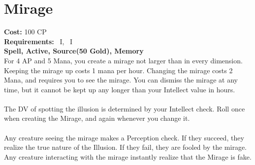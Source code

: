 \section{Mirage}\label{spell:mirage}
\textbf{Cost:} 100 CP\\
\textbf{Requirements:}~ I,~ I\\
\textbf{Spell, Active, Source(50 Gold), Memory}\\
For 4 AP and 5 Mana, you create a mirage not larger than  in every dimension.
Keeping the mirage up costs 1 mana per hour.
Changing the mirage costs 2 Mana, and requires you to see the mirage.
You can dismiss the mirage at any time, but it cannot be kept up any longer than your Intellect value in hours.\\
\\
The DV of spotting the illusion is determined by your Intellect check.
Roll once when creating the Mirage, and again whenever you change it. \\
\\
Any creature seeing the mirage makes a Perception check.
If they succeed, they realize the true nature of the Illusion.
If they fail, they are fooled by the mirage.
Any creature interacting with the mirage instantly realize that the Mirage is fake.\\